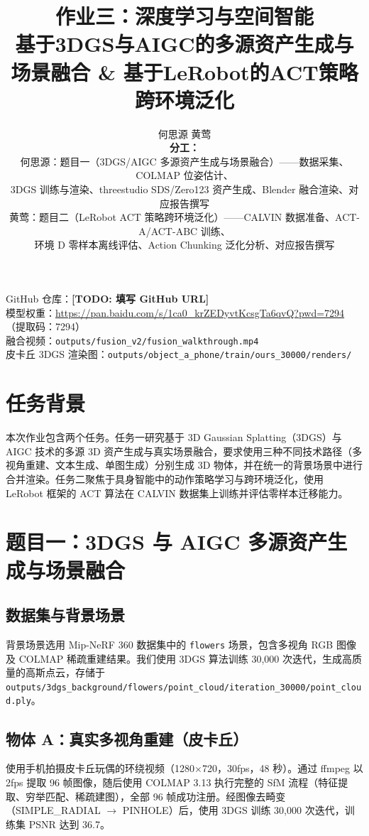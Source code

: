\documentclass{article}
\title{作业三：深度学习与空间智能\\
\large 基于3DGS与AIGC的多源资产生成与场景融合 \& 基于LeRobot的ACT策略跨环境泛化}
\author{
  何思源 \quad 25210980046 \qquad 黄莺 \quad 25210980052 \\[0.5em]
  \textbf{分工：} \\
  何思源：题目一（3DGS/AIGC 多源资产生成与场景融合）——数据采集、COLMAP 位姿估计、\\
  \quad 3DGS 训练与渲染、threestudio SDS/Zero123 资产生成、Blender 融合渲染、对应报告撰写 \\
  黄莺：题目二（LeRobot ACT 策略跨环境泛化）——CALVIN 数据准备、ACT-A/ACT-ABC 训练、\\
  \quad 环境 D 零样本离线评估、Action Chunking 泛化分析、对应报告撰写
}
\begin{document}
\maketitle

\noindent
GitHub 仓库：\textbf{[TODO: 填写 GitHub URL]} \\
模型权重：\url{https://pan.baidu.com/s/1ca0_krZEDyvtKcsgTa6qvQ?pwd=7294}（提取码：7294） \\
融合视频：\texttt{outputs/fusion\_v2/fusion\_walkthrough.mp4} \\
皮卡丘 3DGS 渲染图：\texttt{outputs/object\_a\_phone/train/ours\_30000/renders/}

\section{任务背景}

本次作业包含两个任务。任务一研究基于 3D Gaussian Splatting（3DGS）与 AIGC 技术的多源 3D 资产生成与真实场景融合，要求使用三种不同技术路径（多视角重建、文本生成、单图生成）分别生成 3D 物体，并在统一的背景场景中进行合并渲染。任务二聚焦于具身智能中的动作策略学习与跨环境泛化，使用 LeRobot 框架的 ACT 算法在 CALVIN 数据集上训练并评估零样本迁移能力。

\section{题目一：3DGS 与 AIGC 多源资产生成与场景融合}

\subsection{数据集与背景场景}

背景场景选用 Mip-NeRF 360 数据集中的 \texttt{flowers} 场景，包含多视角 RGB 图像及 COLMAP 稀疏重建结果。我们使用 3DGS 算法训练 30,000 次迭代，生成高质量的高斯点云，存储于 \texttt{outputs/3dgs\_background/flowers/point\_cloud/iteration\_30000/point\_cloud.ply}。

\subsection{物体 A：真实多视角重建（皮卡丘）}

使用手机拍摄皮卡丘玩偶的环绕视频（1280$\times$720，30fps，48 秒）。通过 ffmpeg 以 2fps 提取 96 帧图像，随后使用 COLMAP 3.13 执行完整的 SfM 流程（特征提取、穷举匹配、稀疏建图），全部 96 帧成功注册。经图像去畸变（SIMPLE\_RADIAL $\to$ PINHOLE）后，使用 3DGS 训练 30,000 次迭代，训练集 PSNR 达到 36.7。
\end{document}
